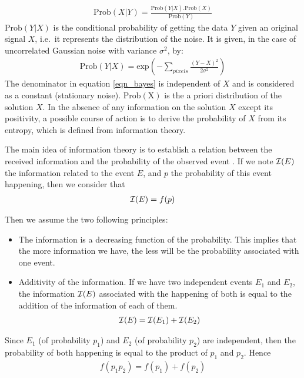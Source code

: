 \documentclass[11pt,a4paper]{article}
\begin{document}
\begin{eqnarray}
 \mathrm{Prob}(X|Y) = \frac{\mathrm{Prob}(Y|X).\mathrm{Prob}(X)}{\mathrm{Prob}(Y)}
\label{eqn_bayes}
\end{eqnarray}
$\mathrm{Prob}(Y|X)$ is the conditional probability of getting the data 
$Y$ given an original signal $X$, i.e.\ it represents the distribution 
of the noise. It is given, in the case of uncorrelated Gaussian 
noise with variance $\sigma^2$, by:
\begin{eqnarray}
 \mathrm{Prob}(Y|X) = \mathrm{exp}(-\sum_{pixels} \frac{ (Y-X)^2}{2{\sigma}^2} )
\label{eqn_proba}
\end{eqnarray}
The denominator in  equation \ref{eqn_bayes} is independent of $X$ and
 is considered as a constant (stationary noise). 
$\mathrm{Prob(X)}$ is the a priori distribution 
of the solution $X$. In the absence of any information on the solution 
$X$ except its positivity, a possible course of action 
is to derive the probability
of $X$ from its entropy, which is defined from information theory.

The main idea of information theory \cite{shannon48} is to establish
a relation between the received information and the probability of
the observed event \cite{bijaoui84}. If we note ${\cal I}(E)$ the information
related to the event $E$, and $p$ the probability of this
event happening, then we consider that
\begin{eqnarray}
{\cal I}(E) = f(p)
\end{eqnarray}

Then we assume the two following principles:
\begin{itemize}
\item The information is a decreasing function of the probability. This 
implies that the more information we have, the  less will be the probability 
associated with one event.
\item Additivity of the information. If we have two independent events 
$E_1$ and $E_2$, the information ${\cal I}(E)$ associated with the happening
of both is equal
to the addition of the information of each of them.
\begin{eqnarray}
{\cal I}(E) = {\cal I}(E_1) + {\cal I}(E_2)
\end{eqnarray}
\end{itemize}

Since $E_1$ (of probability $p_1$) and $E_2$ (of probability $p_2$) are 
independent, then the probability of both happening is equal to the
product of $p_1$ and $p_2$.  Hence
\begin{eqnarray}
f(p_1 p_2) = f(p_1) + f(p_2) 
\end{eqnarray}
\end{document}
